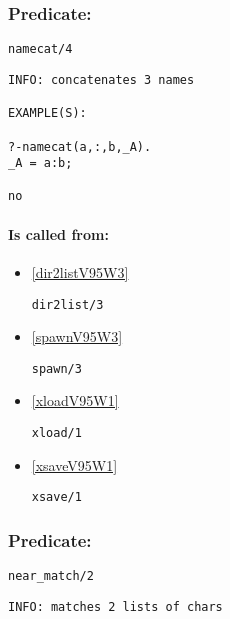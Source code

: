 \subsubsection{Predicate:} \label{namecatV95W4}

\begin{verbatim}
namecat/4
\end{verbatim}

{\small \begin{verbatim}
INFO: concatenates 3 names

EXAMPLE(S):

?-namecat(a,:,b,_A).
_A = a:b;

no

\end{verbatim}}
\paragraph{Is called from:} 
\begin{itemize}
\item \ref{dir2listV95W3} 
\begin{verbatim}
dir2list/3
\end{verbatim}

\item \ref{spawnV95W3} 
\begin{verbatim}
spawn/3
\end{verbatim}

\item \ref{xloadV95W1} 
\begin{verbatim}
xload/1
\end{verbatim}

\item \ref{xsaveV95W1} 
\begin{verbatim}
xsave/1
\end{verbatim}

\end{itemize}

\subsubsection{Predicate:} \label{nearV95WmatchV95W2}

\begin{verbatim}
near_match/2
\end{verbatim}

{\small \begin{verbatim}
INFO: matches 2 lists of chars

\end{verbatim}}
